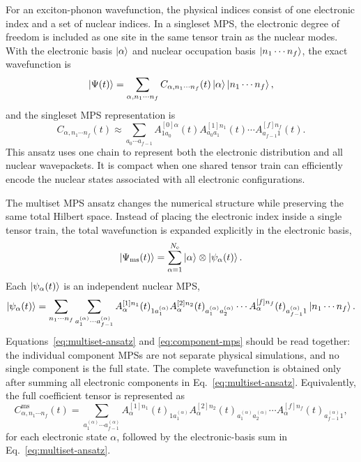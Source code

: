 \documentclass[journal=jctcce,manuscript=article]{achemso}
\begin{document}
For an exciton-phonon wavefunction, the physical indices consist of one electronic index and a set of nuclear indices. In a singleset MPS, the electronic degree of freedom is included as one site in the same tensor train as the nuclear modes. With the electronic basis \(\ket{\alpha}\) and nuclear occupation basis \(\ket{n_1\cdots n_f}\), the exact wavefunction is
\begin{equation}
    \ket{\Psi(t)} = \sum_{\alpha,n_1\cdots n_f}
    C_{\alpha,n_1\cdots n_f}(t)\ket{\alpha}\ket{n_1\cdots n_f},
    \label{eq:full-state}
\end{equation}
and the singleset MPS representation is
\begin{equation}
    C_{\alpha,n_1\cdots n_f}(t) \approx
    \sum_{a_0\cdots a_{f-1}}
    A^{[0]\alpha}_{1a_0}(t)
    A^{[1]n_1}_{a_0a_1}(t)
    \cdots
    A^{[f]n_f}_{a_{f-1}1}(t).
    \label{eq:singleset-mps}
\end{equation}
This ansatz uses one chain to represent both the electronic distribution and all nuclear wavepackets. It is compact when one shared tensor train can efficiently encode the nuclear states associated with all electronic configurations.

The multiset MPS ansatz changes the numerical structure while preserving the same total Hilbert space. Instead of placing the electronic index inside a single tensor train, the total wavefunction is expanded explicitly in the electronic basis,
\begin{equation}
    \ket{\Psi_{\mathrm{ms}}(t)}=
    \sum_{\alpha=1}^{N_{\mathrm e}}\ket{\alpha}\otimes\ket{\psi_{\alpha}(t)}.
    \label{eq:multiset-ansatz}
\end{equation}
Each \(\ket{\psi_{\alpha}(t)}\) is an independent nuclear MPS,
\begin{equation}
    \ket{\psi_{\alpha}(t)} = \sum_{n_1\cdots n_f}
    \sum_{a^{(\alpha)}_1\cdots a^{(\alpha)}_{f-1}}
    A_{\alpha}^{[1]n_1}(t)_{1a^{(\alpha)}_1}
    A_{\alpha}^{[2]n_2}(t)_{a^{(\alpha)}_1a^{(\alpha)}_2}
    \cdots
    A_{\alpha}^{[f]n_f}(t)_{a^{(\alpha)}_{f-1}1}
    \ket{n_1\cdots n_f}.
    \label{eq:component-mps}
\end{equation}
Equations~\ref{eq:multiset-ansatz} and \ref{eq:component-mps} should be read together: the individual component MPSs are not separate physical simulations, and no single component is the full state. The complete wavefunction is obtained only after summing all electronic components in Eq.~\ref{eq:multiset-ansatz}. Equivalently, the full coefficient tensor is represented as
\begin{equation}
    C^{\mathrm{ms}}_{\alpha,n_1\cdots n_f}(t)=
    \sum_{a^{(\alpha)}_1\cdots a^{(\alpha)}_{f-1}}
    A_{\alpha}^{[1]n_1}(t)_{1a^{(\alpha)}_1}
    A_{\alpha}^{[2]n_2}(t)_{a^{(\alpha)}_1a^{(\alpha)}_2}
    \cdots
    A_{\alpha}^{[f]n_f}(t)_{a^{(\alpha)}_{f-1}1},
    \label{eq:multiset-coefficient}
\end{equation}
for each electronic state \(\alpha\), followed by the electronic-basis sum in Eq.~\ref{eq:multiset-ansatz}.
\end{document}
